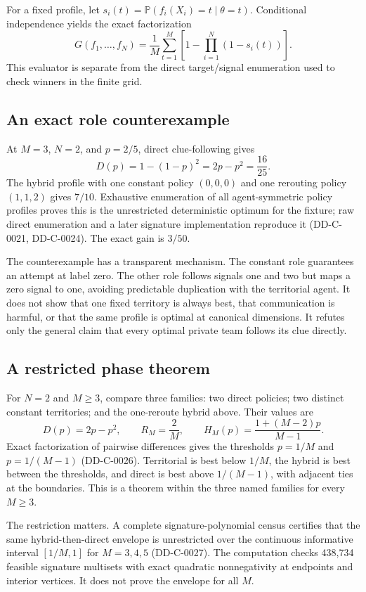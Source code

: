 \documentclass[11pt]{article}
\theoremstyle{remark}
\newcommand{\Prob}{\mathbb{P}}
\begin{document}
For a fixed profile, let $s_i(t)=\Prob(f_i(X_i)=t\mid\theta=t)$. Conditional
independence yields the exact factorization
\[
G(f_1,\ldots,f_N)=\frac1M\sum_{t=1}^M
\left[1-\prod_{i=1}^N(1-s_i(t))\right].
\]
This evaluator is separate from the direct target/signal enumeration used to
check winners in the finite grid.

\subsection{An exact role counterexample}

At $M=3$, $N=2$, and $p=2/5$, direct clue-following gives
\[
D(p)=1-(1-p)^2=2p-p^2=\frac{16}{25}.
\]
The hybrid profile with one constant policy $(0,0,0)$ and one rerouting policy
$(1,1,2)$ gives $7/10$. Exhaustive enumeration of all agent-symmetric policy
profiles proves this is the unrestricted deterministic optimum for the fixture;
raw direct enumeration and a later signature implementation reproduce it
(DD-C-0021, DD-C-0024). The exact gain is $3/50$.



The counterexample has a transparent mechanism. The constant role guarantees an
attempt at label zero. The other role follows signals one and two but maps a zero
signal to one, avoiding predictable duplication with the territorial agent. It
does not show that one fixed territory is always best, that communication is
harmful, or that the same profile is optimal at canonical dimensions. It refutes
only the general claim that every optimal private team follows its clue directly.

\subsection{A restricted phase theorem}

For $N=2$ and $M\ge3$, compare three families: two direct policies; two distinct
constant territories; and the one-reroute hybrid above. Their values are
\[
D(p)=2p-p^2,\qquad R_M=\frac2M,
\qquad H_M(p)=\frac{1+(M-2)p}{M-1}.
\]
Exact factorization of pairwise differences gives the thresholds
$p=1/M$ and $p=1/(M-1)$ (DD-C-0026). Territorial is best below $1/M$,
the hybrid is best between the thresholds, and direct is best above
$1/(M-1)$, with adjacent ties at the boundaries. This is a theorem within the
three named families for every $M\ge3$.

The restriction matters. A complete signature-polynomial census certifies that
the same hybrid-then-direct envelope is unrestricted over the continuous
informative interval $[1/M,1]$ for $M=3,4,5$ (DD-C-0027). The computation checks
438,734 feasible signature multisets with exact quadratic nonnegativity at
endpoints and interior vertices. It does not prove the envelope for all $M$.
\end{document}
